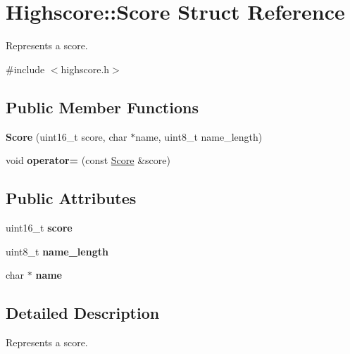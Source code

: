 \hypertarget{struct_highscore_1_1_score}{}\section{Highscore\+:\+:Score Struct Reference}
\label{struct_highscore_1_1_score}


Represents a score.  




{\ttfamily \#include $<$highscore.\+h$>$}

\subsection*{Public Member Functions}
\begin{DoxyCompactItemize}
\item 
\hypertarget{struct_highscore_1_1_score_a12b53d0585857767f7b672a7ca6d6bcd}{}\label{struct_highscore_1_1_score_a12b53d0585857767f7b672a7ca6d6bcd} 
{\bfseries Score} (uint16\+\_\+t score, char $\ast$name, uint8\+\_\+t name\+\_\+length)
\item 
\hypertarget{struct_highscore_1_1_score_a61c93cb0e15d80f574200d210daa02ab}{}\label{struct_highscore_1_1_score_a61c93cb0e15d80f574200d210daa02ab} 
void {\bfseries operator=} (const \hyperlink{struct_highscore_1_1_score}{Score} \&score)
\end{DoxyCompactItemize}
\subsection*{Public Attributes}
\begin{DoxyCompactItemize}
\item 
\hypertarget{struct_highscore_1_1_score_adb7302dea6fad5c7420f7df730829df6}{}\label{struct_highscore_1_1_score_adb7302dea6fad5c7420f7df730829df6} 
uint16\+\_\+t {\bfseries score}
\item 
\hypertarget{struct_highscore_1_1_score_a078c44b0290200e5f94d80bf2d21fec1}{}\label{struct_highscore_1_1_score_a078c44b0290200e5f94d80bf2d21fec1} 
uint8\+\_\+t {\bfseries name\+\_\+length}
\item 
\hypertarget{struct_highscore_1_1_score_aee466300716e218f0ebb6c695a7e52ca}{}\label{struct_highscore_1_1_score_aee466300716e218f0ebb6c695a7e52ca} 
char $\ast$ {\bfseries name}
\end{DoxyCompactItemize}


\subsection{Detailed Description}
Represents a score. 


